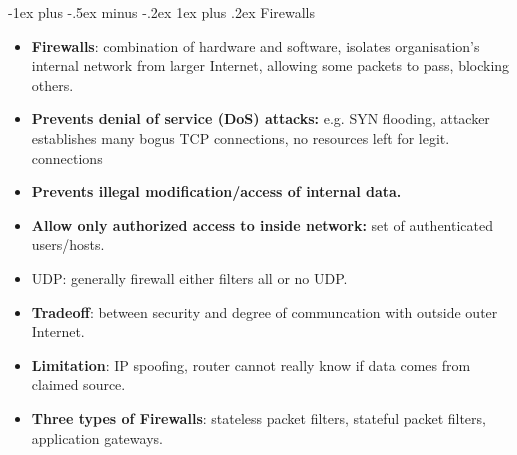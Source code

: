 \documentclass[12pt, landscape]{article}
\makeatletter
\renewcommand{\subsubsection}{\@startsection{subsubsection}{3}{0.1mm}%
                                {-1ex plus -.5ex minus -.2ex}%
                                {1ex plus .2ex}%
                                {\normalfont\small\bfseries}}
\makeatother
\begin{document}
\begin{multicols*}{3}
\subsubsection{Firewalls}
\begin{itemize}
\item \textbf	{Firewalls}: combination of hardware and software, isolates organisation’s internal network from larger Internet, allowing some packets to pass, blocking others.
\item \textbf{Prevents denial of service (DoS) attacks:} e.g. SYN flooding, attacker establishes many bogus TCP connections, no resources left for legit. connections
\item \textbf{Prevents illegal modification/access of internal data.}
\item \textbf{Allow only authorized access to inside network:} set of authenticated users/hosts.
\item UDP: generally firewall either filters all or no UDP.
\item \textbf{Tradeoff}: between security and degree of communcation with outside outer Internet.
\item \textbf{Limitation}: IP spoofing, router cannot really know if data comes from claimed source.
\item \textbf{Three types of Firewalls}: stateless packet filters, stateful packet filters, application gateways.
\end{itemize}

\columnbreak	


\end{multicols*}
\end{document}
